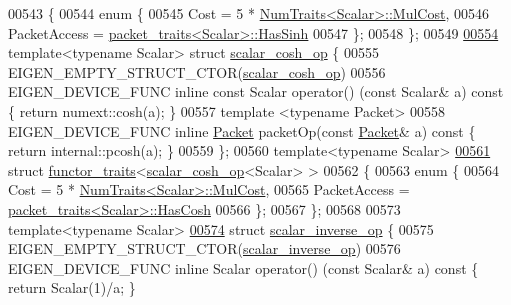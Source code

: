 \begin{DoxyCode}
00543 \{
00544   \textcolor{keyword}{enum} \{
00545     Cost = 5 * \hyperlink{group___core___module_struct_eigen_1_1_num_traits}{NumTraits<Scalar>::MulCost},
00546     PacketAccess = \hyperlink{struct_eigen_1_1internal_1_1packet__traits}{packet\_traits<Scalar>::HasSinh}
00547   \};
00548 \};
00549 
\hyperlink{struct_eigen_1_1internal_1_1scalar__cosh__op}{00554} \textcolor{keyword}{template}<\textcolor{keyword}{typename} Scalar> \textcolor{keyword}{struct }\hyperlink{struct_eigen_1_1internal_1_1scalar__cosh__op}{scalar\_cosh\_op} \{
00555   EIGEN\_EMPTY\_STRUCT\_CTOR(\hyperlink{struct_eigen_1_1internal_1_1scalar__cosh__op}{scalar\_cosh\_op})
00556   EIGEN\_DEVICE\_FUNC \textcolor{keyword}{inline} \textcolor{keyword}{const} Scalar operator() (\textcolor{keyword}{const} Scalar& a)\textcolor{keyword}{ const }\{ \textcolor{keywordflow}{return} numext::cosh(a); \}
00557   \textcolor{keyword}{template} <\textcolor{keyword}{typename} Packet>
00558   EIGEN\_DEVICE\_FUNC \textcolor{keyword}{inline} \hyperlink{union_eigen_1_1internal_1_1_packet}{Packet} packetOp(\textcolor{keyword}{const} \hyperlink{union_eigen_1_1internal_1_1_packet}{Packet}& a)\textcolor{keyword}{ const }\{ \textcolor{keywordflow}{return} internal::pcosh(a); 
      \}
00559 \};
00560 \textcolor{keyword}{template}<\textcolor{keyword}{typename} Scalar>
\hyperlink{struct_eigen_1_1internal_1_1functor__traits_3_01scalar__cosh__op_3_01_scalar_01_4_01_4}{00561} \textcolor{keyword}{struct }\hyperlink{struct_eigen_1_1internal_1_1functor__traits}{functor\_traits}<\hyperlink{struct_eigen_1_1internal_1_1scalar__cosh__op}{scalar\_cosh\_op}<Scalar> >
00562 \{
00563   \textcolor{keyword}{enum} \{
00564     Cost = 5 * \hyperlink{group___core___module_struct_eigen_1_1_num_traits}{NumTraits<Scalar>::MulCost},
00565     PacketAccess = \hyperlink{struct_eigen_1_1internal_1_1packet__traits}{packet\_traits<Scalar>::HasCosh}
00566   \};
00567 \};
00568 
00573 \textcolor{keyword}{template}<\textcolor{keyword}{typename} Scalar>
\hyperlink{struct_eigen_1_1internal_1_1scalar__inverse__op}{00574} \textcolor{keyword}{struct }\hyperlink{struct_eigen_1_1internal_1_1scalar__inverse__op}{scalar\_inverse\_op} \{
00575   EIGEN\_EMPTY\_STRUCT\_CTOR(\hyperlink{struct_eigen_1_1internal_1_1scalar__inverse__op}{scalar\_inverse\_op})
00576   EIGEN\_DEVICE\_FUNC \textcolor{keyword}{inline} Scalar operator() (\textcolor{keyword}{const} Scalar& a)\textcolor{keyword}{ const }\{ \textcolor{keywordflow}{return} Scalar(1)/a; \}

\end{DoxyCode}
